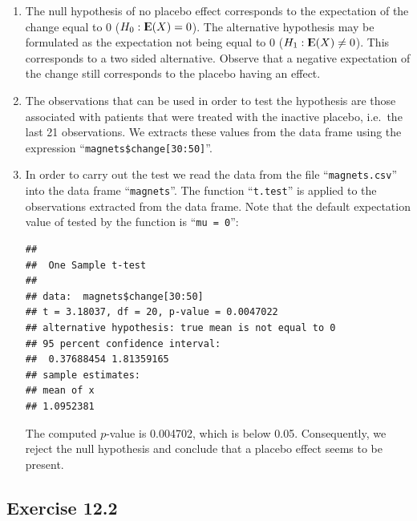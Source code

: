 \documentclass[]{krantz}
\makeatletter
\newenvironment{Shaded}{\begin{snugshade}}{\end{snugshade}}
\newcommand{\KeywordTok}[1]{\textcolor[rgb]{0.13,0.29,0.53}{\textbf{#1}}}
\newcommand{\DecValTok}[1]{\textcolor[rgb]{0.00,0.00,0.81}{#1}}
\newcommand{\StringTok}[1]{\textcolor[rgb]{0.31,0.60,0.02}{#1}}
\newcommand{\OperatorTok}[1]{\textcolor[rgb]{0.81,0.36,0.00}{\textbf{#1}}}
\newcommand{\NormalTok}[1]{#1}
\newcommand{\Expec}{{\rm I\kern-.3em E}}
\newenvironment{kframe}{%
\medskip{}
\setlength{\fboxsep}{.8em}
 \def\at@end@of@kframe{}%
 \ifinner\ifhmode%
  \def\at@end@of@kframe{\end{minipage}}%
  \begin{minipage}{\columnwidth}%
 \fi\fi%
 \def\FrameCommand##1{\hskip\@totalleftmargin \hskip-\fboxsep
 \colorbox{shadecolor}{##1}\hskip-\fboxsep
     \hskip-\linewidth \hskip-\@totalleftmargin \hskip\columnwidth}%
 \MakeFramed {\advance\hsize-\width
   \@totalleftmargin\z@ \linewidth\hsize
   \@setminipage}}%
 {\par\unskip\endMakeFramed%
 \at@end@of@kframe}
\renewenvironment{Shaded}{\begin{kframe}}{\end{kframe}}
\theoremstyle{definition}
\theoremstyle{definition}
\theoremstyle{definition}
\theoremstyle{remark}
\makeatother
\begin{document}
\begin{enumerate}
\def\labelenumi{\arabic{enumi}.}
\item
  The null hypothesis of no placebo effect corresponds to the
  expectation of the change equal to 0 (\(H_0: \Expec(X) = 0\)). The
  alternative hypothesis may be formulated as the expectation not being
  equal to 0 (\(H_1: \Expec(X) \not = 0\)). This corresponds to a two
  sided alternative. Observe that a negative expectation of the change
  still corresponds to the placebo having an effect.
\item
  The observations that can be used in order to test the hypothesis are
  those associated with patients that were treated with the inactive
  placebo, i.e.~the last 21 observations. We extracts these values from
  the data frame using the expression
  ``\texttt{magnets\$change{[}30:50{]}}''.
\item
  In order to carry out the test we read the data from the file
  ``\texttt{magnets.csv}'' into the data frame ``\texttt{magnets}''. The
  function ``\texttt{t.test}'' is applied to the observations extracted
  from the data frame. Note that the default expectation value of tested
  by the function is ``\texttt{mu\ =\ 0}'':

\begin{Shaded}
\end{Shaded}

\begin{verbatim}
## 
##  One Sample t-test
## 
## data:  magnets$change[30:50]
## t = 3.18037, df = 20, p-value = 0.0047022
## alternative hypothesis: true mean is not equal to 0
## 95 percent confidence interval:
##  0.37688454 1.81359165
## sample estimates:
## mean of x 
## 1.0952381
\end{verbatim}

  The computed \(p\)-value is 0.004702, which is below 0.05.
  Consequently, we reject the null hypothesis and conclude that a
  placebo effect seems to be present.
\end{enumerate}

\subsection*{Exercise 12.2}\label{exercise-12.2}
\end{document}
